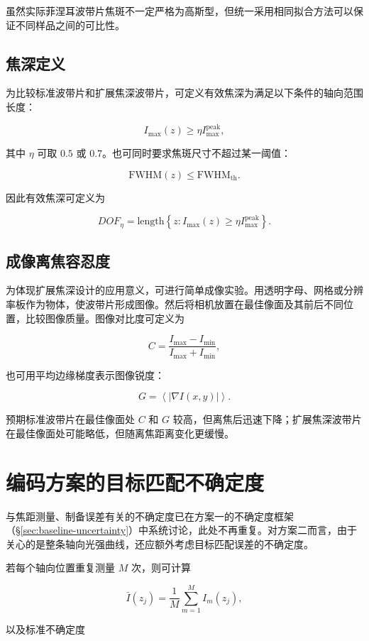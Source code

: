 \documentclass[UTF8,a4paper,11pt]{ctexart}
\begin{document}
虽然实际菲涅耳波带片焦斑不一定严格为高斯型，但统一采用相同拟合方法可以保证不同样品之间的可比性。

\subsection{焦深定义}

为比较标准波带片和扩展焦深波带片，可定义有效焦深为满足以下条件的轴向范围长度：

\[
I_{\max}(z)\geq \eta I_{\max}^{\mathrm{peak}},
\]

其中 $\eta$ 可取 $0.5$ 或 $0.7$。也可同时要求焦斑尺寸不超过某一阈值：

\[
\mathrm{FWHM}(z)\leq \mathrm{FWHM}_{\mathrm{th}}.
\]

因此有效焦深可定义为

\[
DOF_{\eta}
=
\mathrm{length}
\left\{
z:
I_{\max}(z)\geq \eta I_{\max}^{\mathrm{peak}}
\right\}.
\]

\subsection{成像离焦容忍度}

为体现扩展焦深设计的应用意义，可进行简单成像实验。用透明字母、网格或分辨率板作为物体，使波带片形成图像。然后将相机放置在最佳像面及其前后不同位置，比较图像质量。图像对比度可定义为

\[
C=
\frac{I_{\max}-I_{\min}}
{I_{\max}+I_{\min}},
\]

也可用平均边缘梯度表示图像锐度：

\[
G=\left\langle |\nabla I(x,y)| \right\rangle.
\]

预期标准波带片在最佳像面处 $C$ 和 $G$ 较高，但离焦后迅速下降；扩展焦深波带片在最佳像面处可能略低，但随离焦距离变化更缓慢。

\section{编码方案的目标匹配不确定度}

与焦距测量、制备误差有关的不确定度已在方案一的不确定度框架（§\ref{sec:baseline-uncertainty}）中系统讨论，此处不再重复。对方案二而言，由于关心的是整条轴向光强曲线，还应额外考虑目标匹配误差的不确定度。

若每个轴向位置重复测量 $M$ 次，则可计算

\[
\bar I(z_j)=
\frac{1}{M}
\sum_{m=1}^{M}
I_m(z_j),
\]

以及标准不确定度
\end{document}
